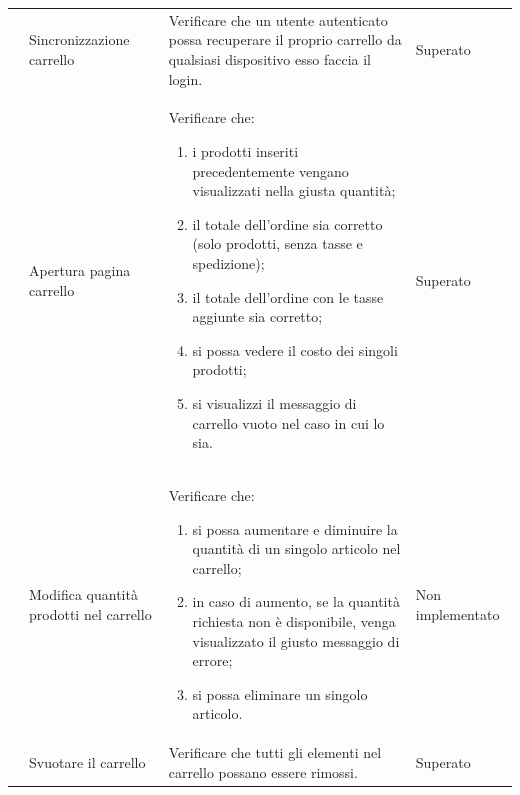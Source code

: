 \begin{center}
\begin{longtable}{|p{0.85cm}|p{2.25cm}|p{9cm}|p{3cm}|}
		 & Sincronizzazione carrello & Verificare che un utente autenticato possa recuperare il proprio carrello da qualsiasi dispositivo esso faccia il login. & Superato\\

		 & Apertura pagina carrello & Verificare che: 
		\begin{enumerate}
			\item i prodotti inseriti precedentemente vengano visualizzati nella giusta quantità;
			\item il totale dell'ordine sia corretto (solo prodotti, senza tasse e spedizione);
			\item il totale dell'ordine con le tasse aggiunte sia corretto;
			\item si possa vedere il costo dei singoli prodotti;
			\item si visualizzi il messaggio di carrello vuoto nel caso in cui lo sia.
		\end{enumerate}  & Superato\\

		 & Modifica quantità prodotti nel carrello & Verificare che:
		\begin{enumerate}
			\item si possa aumentare e diminuire la quantità di un singolo articolo nel carrello;
			\item in caso di aumento, se la quantità richiesta non è disponibile, venga visualizzato il giusto messaggio di errore;
			\item si possa eliminare un singolo articolo.
		\end{enumerate} & Non implementato\\

		 & Svuotare il carrello & Verificare che tutti gli elementi nel carrello possano essere rimossi. & Superato\\


\end{longtable}
\end{center}
